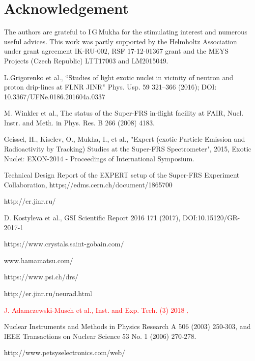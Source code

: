 \documentclass{webofc}
\newcommand{\er}{\textmd{EXPERTroot}}
\newcommand{\red}[1]{\textcolor{red}{#1}}
\begin{document}
	
	
\section{Acknowledgement}
The authors are grateful to I\,G\,Mukha for the stimulating interest and numerous useful advices.
This  work was partly supported by the Helmholtz Association under grant agreement IK-RU-002, RSF 17-12-01367 grant and the MEYS Projects (Czech Republic) LTT17003 and LM2015049.
	
\begin{thebibliography}{99}
	L.Grigorenko et al., “Studies of light exotic nuclei in vicinity of neutron and proton drip-lines at FLNR JINR” Phys. Usp. 59 321–366 (2016); DOI: 10.3367/UFNe.0186.201604a.0337
		
	M. Winkler et al., The status of the Super-FRS in-flight facility at FAIR, Nucl. Instr. and Meth. in Phys. Res. B 266 (2008) 4183.
	
	Geissel, H., Kiselev, O., Mukha, I., et al., "Expert (exotic Particle Emission and Radioactivity by Tracking) Studies at the Super-FRS Spectrometer", 2015, Exotic Nuclei: EXON-2014 - Proceedings of International Symposium.
	
	Technical Design Report of the EXPERT setup of the Super-FRS Experiment Collaboration, https;//edms.cern.ch/document/1865700

	http://er.jinr.ru/

	D. Kostyleva et al., GSI Scientific Report 2016 171 (2017), DOI:10.15120/GR-2017-1
	
	https://www.crystals.saint-gobain.com/
	
	www.hamamatsu.com/
	
	https://www.psi.ch/drs/
	
	http://er.jinr.ru/neurad.html
	
	\red{J. Adamczewski-Musch et al., Inst. and Exp. Tech. (3) 2018 ,}
	
	Nuclear Instruments and Methods in Physics Research A 506 (2003) 250-303, and
	IEEE Transactions on Nuclear Science 53 No. 1 (2006) 270-278.
	
	http://www.petsyselectronics.com/web/
	
\end{thebibliography}
\end{document}
